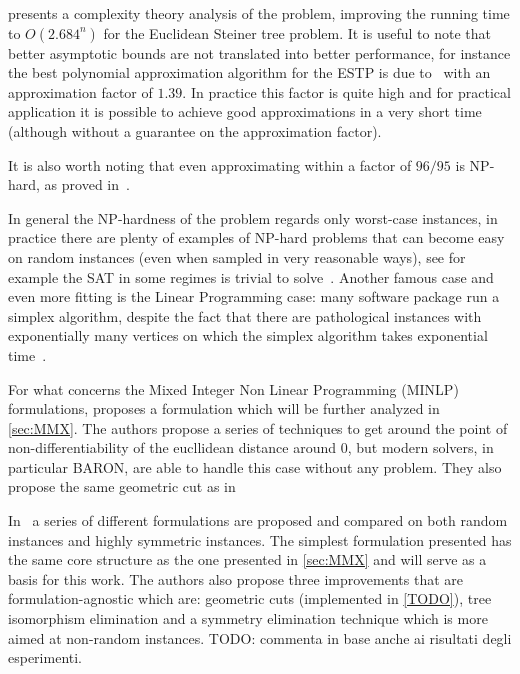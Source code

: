 \documentclass[12pt,a4paper]{article}
\numberwithin{equation}{section}
\theoremstyle{mytheorem}
\theoremstyle{myremark}
\theoremstyle{myparagraph}
\begin{document}
    \cite{wang2008exact} presents a complexity theory analysis of the problem, improving the running time to $O(2.684^n)$ for the Euclidean Steiner tree problem.
    It is useful to note that better asymptotic bounds are not translated into better performance, for instance the best polynomial approximation algorithm
    for the ESTP is due to~\cite{byrka2010improved} with an approximation factor of $1.39$. In practice this factor is quite high and for practical
    application it is possible to achieve good approximations in a very short time (although without a guarantee on the approximation factor).

    It is also worth noting that even approximating within a factor of $96/95$ is NP-hard, as proved in~\cite{chlebik2008steiner}.
    

    In general the NP-hardness of the problem regards only worst-case instances, in practice there are plenty of examples of NP-hard problems
    that can become easy on random instances (even when sampled in very reasonable ways), see for example the SAT in some regimes is trivial to solve~\cite{zecchinaparisi}.
    Another famous case and even more fitting is the Linear Programming case: many software package run a simplex algorithm, despite the fact that
    there are pathological instances with exponentially many vertices on which the simplex algorithm takes exponential time~\cite{bertsimas1997introduction}.

    For what concerns the Mixed Integer Non Linear Programming (MINLP) formulations, \cite{mmx} proposes a formulation which will be further analyzed in \ref{sec:MMX}.
    The authors propose a series of techniques to get around the point of non-differentiability of the eucllidean distance around $0$, but modern solvers, in particular BARON,
    are able to handle this case without any problem. 
    They also propose the same geometric cut as in~\cite{}

    In~\cite{pinto2020new} a series of different formulations are proposed and compared on both random instances and highly symmetric instances. The simplest formulation
    presented has the same core structure as the one presented in \ref{sec:MMX} and will serve as a basis for this work. The authors also propose three improvements
    that are formulation-agnostic which are: geometric cuts (implemented in \ref{TODO}), tree isomorphism elimination and a symmetry elimination technique which is more 
    aimed at non-random instances. TODO: commenta in base anche ai risultati degli esperimenti.
\end{document}
